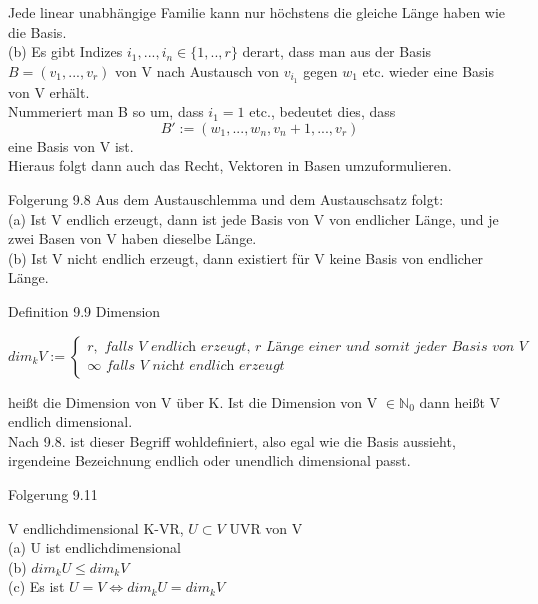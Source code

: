 \documentclass[headsepline,12pt,a4paper]{scrartcl}
\begin{document}
Jede linear unabhängige Familie kann nur höchstens die gleiche Länge haben wie die Basis. \\

(b) Es gibt Indizes $i_1,...,i_n \in \{1,..,r\}$ derart, dass man aus der Basis $B = (v_1,...,v_r)$ von V nach Austausch von $v_{i_1}$ gegen $w_1$ etc. wieder eine Basis von V erhält. \\
Nummeriert man B so um, dass $i_1 = 1$ etc., bedeutet dies, dass 
$$ B':=(w_1,...,w_n,v_n+1,...,v_r) $$ 
eine Basis von V ist. \\

Hieraus folgt dann auch das Recht, Vektoren in Basen umzuformulieren. \\

\item[Folgerung 9.8]
Aus dem Austauschlemma und dem Austauschsatz folgt: \\

(a) Ist V endlich erzeugt, dann ist jede Basis von V von endlicher Länge, und je zwei Basen von V haben dieselbe Länge. \\
(b) Ist V nicht endlich erzeugt, dann existiert für V keine Basis von endlicher Länge. \\

\newpage

\begin{center}
\item[Definition 9.9 Dimension]
\end{center}

$$\textit{dim}_k V:= \begin{cases} 
r, \textit{      falls V endlich erzeugt, r Länge einer und somit jeder Basis von V} \\
\infty \textit{     falls V nicht endlich erzeugt } 
\end{cases} $$

heißt die Dimension von V über K. Ist die Dimension von V $\in \mathbb{N}_0$ dann heißt V endlich dimensional. \\
Nach 9.8. ist dieser Begriff wohldefiniert, also egal wie die Basis aussieht, irgendeine Bezeichnung endlich oder unendlich dimensional passt. \\
\begin{center}
\item[Folgerung 9.11]
\end{center}
V endlichdimensional K-VR, $U \subset V$ UVR von V \\

(a) U ist endlichdimensional \\
(b) $\textit{dim}_k U \leq \textit{dim}_k V $ \\
(c) Es ist $U=V \Leftrightarrow \textit{dim}_k U = \textit{dim}_k V$ \\
\end{document}
